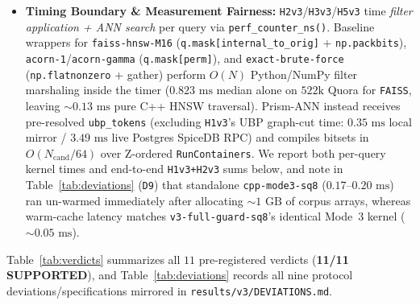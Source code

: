 \documentclass[conference]{IEEEtran}
\begin{document}
\begin{itemize}
    \item \textbf{Timing Boundary \& Measurement Fairness:} \texttt{H2v3}/\texttt{H3v3}/\texttt{H5v3} time \textit{filter application + ANN search} per query via \texttt{perf\_counter\_ns()}. Baseline wrappers for \texttt{faiss-hnsw-M16} (\texttt{q.mask[internal\_to\_orig]} + \texttt{np.packbits}), \texttt{acorn-1}/\texttt{acorn-gamma} (\texttt{q.mask[perm]}), and \texttt{exact-brute-force} (\texttt{np.flatnonzero} + gather) perform $O(N)$ Python/NumPy filter marshaling inside the timer ($0.823\text{ ms}$ median alone on $522\text{k}$ Quora for \texttt{FAISS}, leaving ${\sim}0.13\text{ ms}$ pure C++ HNSW traversal). Prism-ANN instead receives pre-resolved \texttt{ubp\_tokens} (excluding \texttt{H1v3}'s UBP graph-cut time: $0.35\text{ ms}$ local mirror / $3.49\text{ ms}$ live Postgres SpiceDB RPC) and compiles bitsets in $O(N_{\text{cand}}/64)$ over Z-ordered \texttt{RunContainers}. We report both per-query kernel times and end-to-end \texttt{H1v3+H2v3} sums below, and note in Table~\ref{tab:deviations} (\texttt{D9}) that standalone \texttt{cpp-mode3-sq8} ($0.17$--$0.20\text{ ms}$) ran un-warmed immediately after allocating ${\sim}1\text{ GB}$ of corpus arrays, whereas warm-cache latency matches \texttt{v3-full-guard-sq8}'s identical Mode~3 kernel (${\sim}0.05\text{ ms}$).
\end{itemize}

Table~\ref{tab:verdicts} summarizes all $11$ pre-registered verdicts (\textbf{11/11 SUPPORTED}), and Table~\ref{tab:deviations} records all nine protocol deviations/specifications mirrored in \texttt{results/v3/DEVIATIONS.md}.
\end{document}
